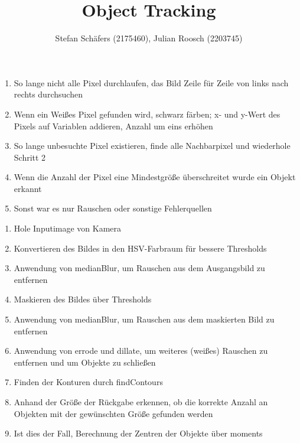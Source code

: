 \documentclass[12pt]{article}
\title{Object Tracking}
\author{Stefan Schäfers (2175460), Julian Roosch (2203745)}
\begin{document}
\maketitle
\begin{enumerate}
\item So lange nicht alle Pixel durchlaufen, das Bild Zeile für Zeile von links nach rechts durchsuchen
\item Wenn ein Weißes Pixel gefunden wird, schwarz färben; x- und y-Wert des Pixels auf Variablen addieren, Anzahl um eins erhöhen
\item So lange \glqq unbesuchte\grqq{} Pixel existieren, finde alle Nachbarpixel und wiederhole Schritt 2
\item Wenn die Anzahl der Pixel eine Mindestgröße überschreitet wurde ein Objekt erkannt
\item Sonst war es nur Rauschen oder sonstige Fehlerquellen
\end{enumerate}

\begin{enumerate}
\item Hole Inputimage von Kamera
\item Konvertieren des Bildes in den HSV-Farbraum für bessere Thresholds
\item Anwendung von medianBlur, um Rauschen aus dem Ausgangsbild zu entfernen
\item Maskieren des Bildes über Thresholds
\item Anwendung von medianBlur, um Rauschen aus dem maskierten Bild zu entfernen
\item Anwendung von errode und dillate, um weiteres (weißes) Rauschen zu entfernen und um Objekte zu schließen
\item Finden der Konturen durch findContours
\item Anhand der Größe der Rückgabe erkennen, ob die korrekte Anzahl an Objekten mit der gewünschten Größe gefunden werden
\item Ist dies der Fall, Berechnung der Zentren der Objekte über moments
\end{enumerate}
\end{document}
